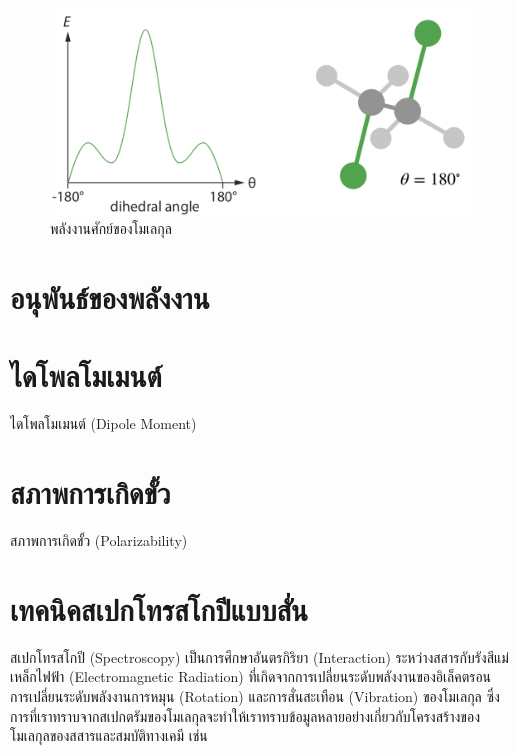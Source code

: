 \begin{figure}[htbp]
    \centering
    \includegraphics[width=0.9\linewidth]{fig/PES_C2H4Cl2.png}
    \caption{พลังงานศักย์ของโมเลกุล }
    \label{fig:pes_c2h4cl2}
\end{figure}

\section{อนุพันธ์ของพลังงาน}
\label{ssec:energy_der}

\section{ไดโพลโมเมนต์}
\label{sec:dipole_moment}

ไดโพลโมเมนต์ (Dipole Moment)


\section{สภาพการเกิดขั้ว}
\label{sec:polariz}

สภาพการเกิดขั้ว (Polarizability)

\section{เทคนิคสเปกโทรสโกปีแบบสั่น}
\label{sec:spectro}

สเปกโทรสโกปี (Spectroscopy) เป็นการศึกษาอันตรกิริยา (Interaction) ระหว่างสสารกับรังสีแม่เหล็กไฟฟ้า (Electromagnetic Radiation) 
ที่เกิดจากการเปลี่ยนระดับพลังงานของอิเล็คตรอน การเปลี่ยนระดับพลังงานการหมุน (Rotation) และการสั่นสะเทือน (Vibration) ของโมเลกุล 
ซึ่งการที่เราทราบจากสเปกตรัมของโมเลกุลจะทำให้เราทราบข้อมูลหลายอย่างเกี่ยวกับโครงสร้างของโมเลกุลของสสารและสมบัติทางเคมี เช่น

